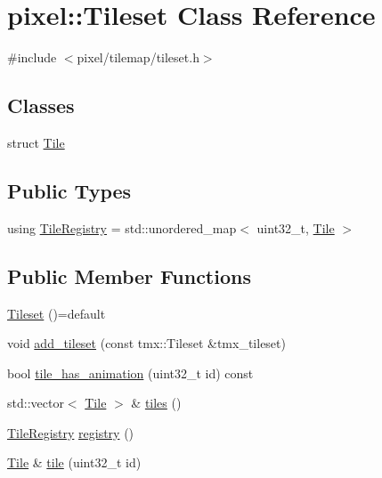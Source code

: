 \hypertarget{classpixel_1_1_tileset}{}\section{pixel\+:\+:Tileset Class Reference}
\label{classpixel_1_1_tileset}


{\ttfamily \#include $<$pixel/tilemap/tileset.\+h$>$}

\subsection*{Classes}
\begin{DoxyCompactItemize}
\item 
struct \hyperlink{structpixel_1_1_tileset_1_1_tile}{Tile}
\end{DoxyCompactItemize}
\subsection*{Public Types}
\begin{DoxyCompactItemize}
\item 
using \hyperlink{classpixel_1_1_tileset_a07353350c368c82275a5f821b0b2ee94}{Tile\+Registry} = std\+::unordered\+\_\+map$<$ uint32\+\_\+t, \hyperlink{structpixel_1_1_tileset_1_1_tile}{Tile} $>$
\end{DoxyCompactItemize}
\subsection*{Public Member Functions}
\begin{DoxyCompactItemize}
\item 
\hyperlink{classpixel_1_1_tileset_a4ba3df1394c0dbf5f2d1ab38545d5bcc}{Tileset} ()=default
\item 
void \hyperlink{classpixel_1_1_tileset_a9c4bbb518051280dbce888b7e6393d16}{add\+\_\+tileset} (const tmx\+::\+Tileset \&tmx\+\_\+tileset)
\item 
bool \hyperlink{classpixel_1_1_tileset_a12eb0d5ebf051a4838a1fe8d829bbe04}{tile\+\_\+has\+\_\+animation} (uint32\+\_\+t id) const
\item 
std\+::vector$<$ \hyperlink{structpixel_1_1_tileset_1_1_tile}{Tile} $>$ \& \hyperlink{classpixel_1_1_tileset_a3c1a733757e487ddabf79488c748e3eb}{tiles} ()
\item 
\hyperlink{classpixel_1_1_tileset_a07353350c368c82275a5f821b0b2ee94}{Tile\+Registry} \hyperlink{classpixel_1_1_tileset_a762d3d382fdc40375f1c3f224d7e6cad}{registry} ()
\item 
\hyperlink{structpixel_1_1_tileset_1_1_tile}{Tile} \& \hyperlink{classpixel_1_1_tileset_ac0eca2f1fbe3ad309d8bc199311a5459}{tile} (uint32\+\_\+t id)
\end{DoxyCompactItemize}

